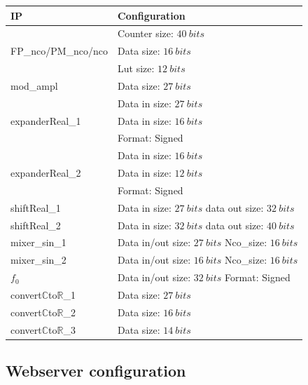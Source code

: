 \documentclass[12pt,oneside]{article}
\begin{document}
\begin{center}
	\begin{tabular}{|>{\centering\arraybackslash}m{.3\linewidth} | >{\centering\arraybackslash}m{.3\linewidth} |}
		\hline
		IP & Configuration \\
		\hline
		& Counter size: $40~bits$\\ FP\_nco/PM\_nco/nco &Data size: $16~bits$\\ &Lut size: $12~bits$ \\
		\hline
		mod\_ampl&Data size: $27~bits$ \\
		\hline
		& Data in size: $27~bits$\\expanderReal\_1 & Data in size: $16~bits$\\ &Format: Signed \\
		\hdashline
		& Data in size: $16~bits$\\expanderReal\_2 & Data in size: $12~bits$\\ &Format: Signed \\
		\hline
		shiftReal\_1&Data in size: $27~bits$ \newline data out size: $32~bits$ \\
		\hdashline
		shiftReal\_2&Data in size: $32~bits$ \newline data out size: $40~bits$ \\
		\hline
		mixer\_sin\_1&Data in/out size: $27~bits$ \newline Nco\_size: $16~bits$ \\
		\hdashline
		mixer\_sin\_2&Data in/out size: $16~bits$ \newline Nco\_size: $16~bits$ \\
		\hline
		$f_0$&Data in/out size: $32~bits$ \newline Format: Signed \\
		\hline
		convert$\mathbb{C}$to$\mathbb{R}$\_1&Data size: $27~bits$\\
		\hdashline
		convert$\mathbb{C}$to$\mathbb{R}$\_2&Data size: $16~bits$\\
		\hdashline
		convert$\mathbb{C}$to$\mathbb{R}$\_3&Data size: $14~bits$\\
		\hline
	\end{tabular}
\end{center}

\vspace{0.5cm}
\subsection{Webserver configuration}
\end{document}
